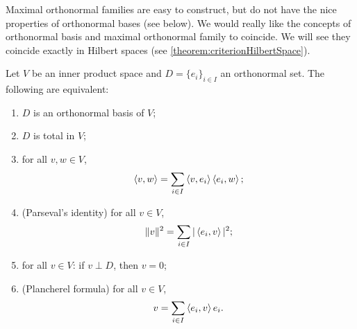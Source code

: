 Maximal orthonormal families are easy to construct, but do not have the nice properties of orthonormal bases (see below). We would really like the concepts of orthonormal basis and maximal orthonormal family to coincide. We will see they coincide exactly in Hilbert spaces (see \ref{theorem:criterionHilbertSpace}).

\begin{proposition} \label{prop:totalONBParsevalEquivalence} \label{prop:plancherel}
Let $V$ be an inner product space and $D = \{e_i\}_{i\in I}$ an orthonormal set. The following are equivalent:
\begin{enumerate}
\item $D$ is an orthonormal basis of $V$;
\item $D$ is total in $V$;
\item for all $v,w\in V$,
\[ \left\langle v,w \right\rangle = \sum_{i\in I}\left\langle v,e_i \right\rangle\left\langle e_i,w \right\rangle; \]
\item \textup{(Parseval's identity)} for all $v\in V$,
\[ \lVert v\rVert^2 = \sum_{i\in I}|\left\langle e_i,v \right\rangle|^2; \]
\item for all $v\in V$: if $v\perp D$, then $v=0$;
\item \textup{(Plancherel formula)} for all $v\in V$,
\[ v = \sum_{i\in I}\left\langle e_{i},v \right\rangle e_{i}. \]
\end{enumerate}
\end{proposition}
